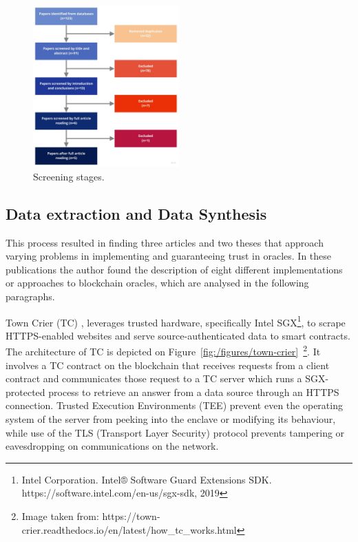 \documentclass[final,3p,12pt,twocolumn]{elsarticle}
\begin{document}
\begin{figure}[H]
  \begin{center}
    \leavevmode
    \includegraphics[width=0.5\textwidth]{figures/paper-screening.jpg}
    \caption{Screening stages.}
    \label{fig:/figures/paper-screening}
  \end{center}
\end{figure}


\subsection{Data extraction and Data Synthesis}\label{data-synthesis}

This process resulted in finding three articles and two theses that approach varying problems in implementing and guaranteeing trust in oracles. In these publications the author found the description of eight different implementations or approaches to blockchain oracles, which are analysed in the following paragraphs.

Town Crier (TC) \cite{Zhang2016a}, leverages trusted hardware, specifically Intel SGX\footnote{Intel Corporation. Intel® Software Guard Extensions SDK. https://software.intel.com/en-us/sgx-sdk, 2019}, to scrape HTTPS-enabled websites and serve source-authenticated data to smart contracts. The architecture of TC is depicted on Figure~\ref{fig:/figures/town-crier}~\footnote{Image taken from: https://town-crier.readthedocs.io/en/latest/how\_tc\_works.html}. It involves a TC contract on the blockchain that receives requests from a client contract and communicates those request to a TC server which runs a SGX-protected process to retrieve an answer from a data source through an HTTPS connection. Trusted Execution Environments (TEE) prevent even the operating system of the server from peeking into the enclave or modifying its behaviour, while use of the TLS (Transport Layer Security) protocol prevents tampering or eavesdropping on communications on the network.
\end{document}
